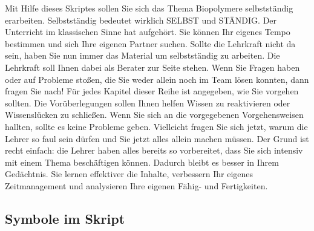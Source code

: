 \documentclass{scrartcl}  %
\begin{document}
		Mit Hilfe dieses Skriptes sollen Sie sich das Thema Biopolymere selbstständig erarbeiten. Selbstständig bedeutet wirklich SELBST und STÄNDIG. Der Unterricht im klassischen Sinne hat aufgehört. Sie können Ihr eigenes Tempo bestimmen und sich Ihre eigenen Partner suchen. Sollte die Lehrkraft nicht da sein, haben Sie nun immer das Material um selbstständig zu arbeiten.
		Die Lehrkraft soll Ihnen dabei als Berater zur Seite stehen. Wenn Sie Fragen haben oder auf Probleme stoßen, die Sie weder allein noch im Team lösen konnten, dann fragen Sie nach! \newline
		Für jedes Kapitel dieser Reihe ist angegeben, wie Sie vorgehen sollten. Die Vorüberlegungen sollen Ihnen helfen Wissen zu reaktivieren oder Wissenslücken zu schließen. Wenn Sie sich an die vorgegebenen Vorgehensweisen hallten, sollte es keine Probleme geben.
		Vielleicht fragen Sie sich jetzt, warum die Lehrer so faul sein dürfen und Sie jetzt alles allein machen müssen. Der Grund ist recht einfach: die Lehrer haben alles bereits so vorbereitet, dass Sie sich intensiv mit einem Thema beschäftigen können. Dadurch bleibt es besser in Ihrem Gedächtnis. Sie lernen effektiver die Inhalte, verbessern Ihr eigenes Zeitmanagement und analysieren Ihre eigenen Fähig- und Fertigkeiten. \newline

		\subsection{Symbole im Skript}

\end{document}
